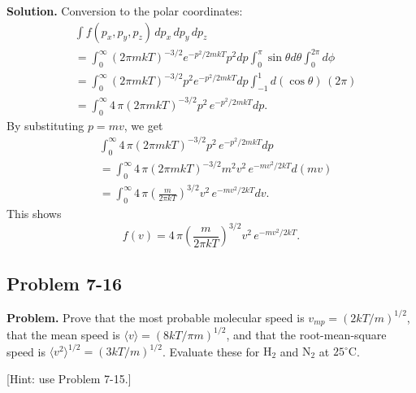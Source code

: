 \documentclass[twocolumn, 10pt]{article}
\numberwithin{equation}{section}
\newenvironment{problem}
{\par\medskip\sffamily \color{problue}
  \textbf{Problem. }\ignorespaces}
{\medskip}
\newenvironment{solution}
{\par\medskip
  \textbf{Solution. }\ignorespaces}
{\medskip}
\begin{document}
\begin{solution}
Conversion to the polar coordinates:
\begin{align*}
  &\int f(p_x, p_y, p_z) \, d p_x \, d p_y \, d p_z
  \\
  &=
  \int_0^\infty
    (2\pi m kT)^{-3/2} e^{-p^2/2mkT} p^2
    d p
  \int_0^\pi \sin\theta d\theta
  \int_0^{2\pi} d\phi
  \\
  &=
  \int_0^\infty
    (2\pi m kT)^{-3/2}
    p^2 e^{-p^2/2mkT}
    d p
    \int_{-1}^{1} d(\cos\theta)
    \, (2\pi)
  \\
  &=
  \int_0^\infty
    4 \, \pi (2\pi m kT)^{-3/2}
    p^2 \, e^{-p^2/2mkT}
    d p.
\end{align*}
By substituting $p = mv$, we get
\begin{align*}
  &\int_0^\infty
    4 \, \pi (2\pi m kT)^{-3/2}
    p^2 \, e^{-p^2/2mkT}
    d p
  \\
  &=
  \int_0^\infty
    4 \, \pi (2\pi m kT)^{-3/2}
    m^2 v^2 \, e^{-m v^2/2kT}
    d (m v)
  \\
  &=
  \int_0^\infty
    4 \, \pi \left(\frac{m}{2\pi kT}\right)^{3/2}
    v^2 \, e^{-m v^2/2kT}
    d v.
\end{align*}
This shows
$$
f(v) = 4 \, \pi \left(\frac{m}{2\pi kT}\right)^{3/2}
    v^2 \, e^{-m v^2/2kT}.
$$
\end{solution}

\subsection{Problem 7-16}

\begin{problem}
  Prove that the most probable molecular speed is
  $v_{mp} = (2kT/m)^{1/2}$,
  that the mean speed is
  $\langle v \rangle = (8kT/\pi m)^{1/2}$,
  and that the root-mean-square speed is
  $\langle v^2 \rangle^{1/2} = (3kT/m)^{1/2}$.
  Evaluate these for $\mathrm{H}_2$ and $\mathrm{N}_2$
  at $25^{\circ}\mathrm{C}$.

  [Hint: use Problem 7-15.]
\end{problem}
\end{document}
